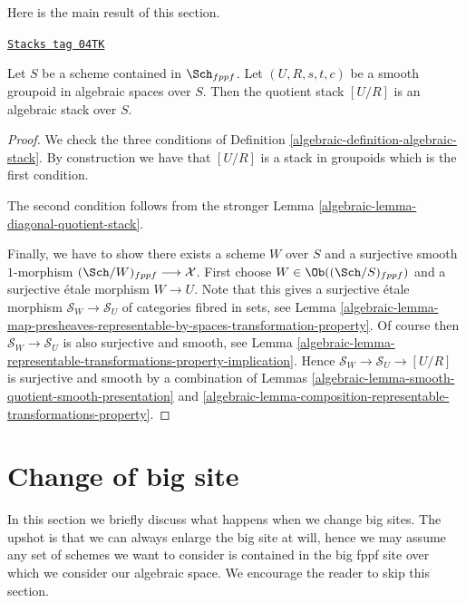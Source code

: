 Here is the main result of this section.

\begin{theorem}
\label{algebraic-theorem-smooth-groupoid-gives-algebraic-stack}
\href{https://stacks.math.columbia.edu/tag/04TK}{\texttt{Stacks tag 04TK}}

Let $S$ be a scheme contained in $\Sch_{fppf}$.
Let $(U, R, s, t, c)$ be a smooth groupoid in algebraic spaces over $S$.
Then the quotient stack $[U/R]$ is an algebraic stack over $S$.
\end{theorem}

\begin{proof}

We check the three conditions of
Definition \ref{algebraic-definition-algebraic-stack}.
By construction we have that $[U/R]$ is a stack in groupoids
which is the first condition.

\medskip\noindent
The second condition follows from the stronger
Lemma \ref{algebraic-lemma-diagonal-quotient-stack}.

\medskip\noindent
Finally, we have to show there exists a scheme $W$ over $S$
and a surjective smooth $1$-morphism
$(\Sch/W)_{fppf} \longrightarrow \mathcal{X}$.
First choose $W \in \Ob((\Sch/S)_{fppf})$ and a
surjective \'etale morphism $W \to U$. Note that this
gives a surjective \'etale morphism $\mathcal{S}_W \to \mathcal{S}_U$
of categories fibred in sets, see
Lemma
\ref{algebraic-lemma-map-presheaves-representable-by-spaces-transformation-property}.
Of course then $\mathcal{S}_W \to \mathcal{S}_U$ is also surjective and
smooth, see
Lemma \ref{algebraic-lemma-representable-transformations-property-implication}.
Hence $\mathcal{S}_W \to \mathcal{S}_U \to [U/R]$ is surjective
and smooth by a combination of
Lemmas \ref{algebraic-lemma-smooth-quotient-smooth-presentation} and
\ref{algebraic-lemma-composition-representable-transformations-property}.
\end{proof}

\section{Change of big site}
\label{algebraic-section-change-big-site}
In this section we briefly discuss what happens when we change big sites.
The upshot is that we can always enlarge the big site at will, hence we
may assume any set of schemes we want to consider is contained in the big
fppf site over which we consider our algebraic space.
We encourage the reader to skip this section.

